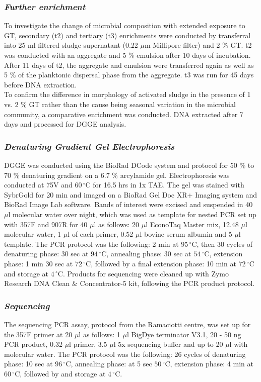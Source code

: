 \documentclass[twoside]{article}
\begin{document}
\subsubsection{\emph{Further enrichment}}
To investigate the change of microbial composition with extended exposure to GT, secondary (t2) and tertiary (t3) enrichments were conducted by transferral into 25 ml filtered sludge supernatant (0.22 $\mu$m Millipore filter) and 2 \% GT. t2 was conducted with an aggregate and 5 \% emulsion after 10 days of incubation. After 11 days of t2, the aggregate and emulsion were transferred again as well as 5 \% of the planktonic dispersal phase from the aggregate. t3 was run for 45 days before DNA extraction.\\

To confirm the difference in morphology of activated sludge in the presence of 1 vs. 2 \% GT rather than the cause being seasonal variation in the microbial community, a comparative enrichment was conducted. DNA extracted after 7 days and processed for DGGE analysis.
 
\subsubsection{\emph{Denaturing Gradient Gel Electrophoresis}}
DGGE was conducted using the BioRad DCode system and protocol for 50 \% to 70 \% denaturing gradient on a 6.7 \% arcylamide gel. Electrophoresis was conducted at 75V and $60\,^{\circ}\mathrm{C}$ for 16.5 hrs in 1x TAE. The gel was stained with SybrGold for 20 min and imaged on a BioRad Gel Doc XR+ Imaging system and BioRad Image Lab software. Bands of interest were excised and suspended in 40 $\mu$l molecular water over night, which was used as template for nested PCR set up with 357F and 907R for 40 $\mu$l as follows: 20 $\mu$l EconoTaq Master mix, 12.48 $\mu$l molecular water, 1 $\mu$l of each primer, 0.52 $\mu$l bovine serum albumin and 5 $\mu$l template. The PCR protocol was the following: 2 min at $95\,^{\circ}\mathrm{C}$, then 30 cycles of denaturing phase: 30 sec at $94\,^{\circ}\mathrm{C}$, annealing phase: 30 sec at  $54\,^{\circ}\mathrm{C}$, extension phase: 1 min 30 sec at $72\,^{\circ}\mathrm{C}$, followed by a final extension phase: 10 min at $72\,^{\circ}\mathrm{C}$ and storage at $4\,^{\circ}\mathrm{C}$. Products for sequencing were cleaned up with Zymo Research DNA Clean \& Concentrator-5 kit, following the PCR product protocol.

\subsubsection{\emph{Sequencing}}
The sequencing PCR assay, protocol from the Ramaciotti centre, was set up for the 357F primer at 20 $\mu$l as follows: 1 $\mu$l BigDye terminator V3.1, 20 - 50 ng PCR product, 0.32 $\mu$l primer, 3.5 $\mu$l 5x sequencing buffer and up to 20 $\mu$l with molecular water. The PCR protocol was the following: 26 cycles of denaturing phase: 10 sec at $96\,^{\circ}\mathrm{C}$, annealing phase:  at 5 sec $50\,^{\circ}\mathrm{C}$, extension phase: 4 min at $60\,^{\circ}\mathrm{C}$, followed by and storage at $4\,^{\circ}\mathrm{C}$.\\
\end{document}

